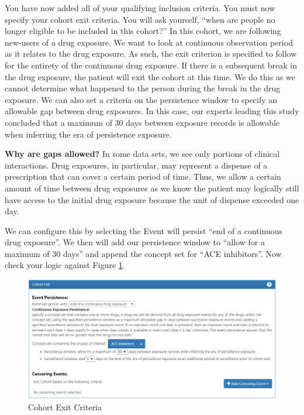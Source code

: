 \documentclass[11pt]{book}
\theoremstyle{definition}
\theoremstyle{definition}
\theoremstyle{definition}
\theoremstyle{remark}
\begin{document}
You have now added all of your qualifying inclusion criteria. You must now specify your cohort exit criteria. You will ask yourself, ``when are people no longer eligible to be included in this cohort?'' In this cohort, we are following new-users of a drug exposure. We want to look at continuous observation period as it relates to the drug exposure. As such, the exit criterion is specified to follow for the entirety of the continuous drug exposure. If there is a subsequent break in the drug exposure, the patient will exit the cohort at this time. We do this as we cannot determine what happened to the person during the break in the drug exposure. We can also set a criteria on the persistence window to specify an allowable gap between drug exposures. In this case, our experts leading this study concluded that a maximum of 30 days between exposure records is allowable when inferring the era of persistence exposure.

\textbf{Why are gaps allowed?} In some data sets, we see only portions of clinical interactions. Drug exposures, in particular, may represent a dispense of a prescription that can cover a certain period of time. Thus, we allow a certain amount of time between drug exposures as we know the patient may logically still have access to the initial drug exposure because the unit of dispense exceeded one day.

We can configure this by selecting the Event will persist ``end of a continuous drug exposure''. We then will add our persistence window to ``allow for a maximum of 30 days'' and append the concept set for ``ACE inhibitors''. Now check your logic against Figure \ref{fig:ATLAScohortexit}.

\begin{figure}

{\centering \includegraphics[width=1\linewidth]{images/Cohorts/cohort-exit} 

}

\caption{Cohort Exit Criteria}\label{fig:ATLAScohortexit}
\end{figure}
\end{document}
